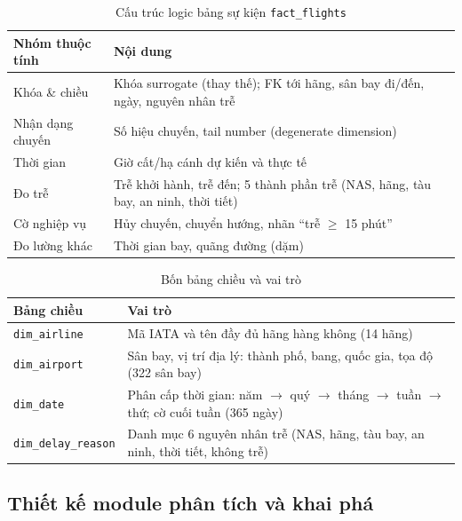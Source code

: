 \begin{table}[H]
\centering
\caption{Cấu trúc logic bảng sự kiện \texttt{fact\_flights}}
\vspace{4pt}
\begin{tabular}{|p{4cm}|p{10cm}|}
\hline
\textbf{Nhóm thuộc tính} & \textbf{Nội dung} \\ \hline
Khóa \& chiều & Khóa surrogate (thay thế); FK tới hãng, sân bay đi/đến, ngày, nguyên nhân trễ \\ \hline
Nhận dạng chuyến & Số hiệu chuyến, tail number (degenerate dimension) \\ \hline
Thời gian & Giờ cất/hạ cánh dự kiến và thực tế \\ \hline
Đo trễ & Trễ khởi hành, trễ đến; 5 thành phần trễ (NAS, hãng, tàu bay, an ninh, thời tiết) \\ \hline
Cờ nghiệp vụ & Hủy chuyến, chuyển hướng, nhãn ``trễ $\geq$ 15 phút'' \\ \hline
Đo lường khác & Thời gian bay, quãng đường (dặm) \\ \hline
\end{tabular}
\label{tab:fact_flights_logical}
\end{table}

\begin{table}[H]
\centering
\caption{Bốn bảng chiều và vai trò}
\vspace{4pt}
\begin{tabular}{|p{4cm}|p{10cm}|}
\hline
\textbf{Bảng chiều} & \textbf{Vai trò} \\ \hline
\texttt{dim\_airline} & Mã IATA và tên đầy đủ hãng hàng không (14 hãng) \\ \hline
\texttt{dim\_airport} & Sân bay, vị trí địa lý: thành phố, bang, quốc gia, tọa độ (322 sân bay) \\ \hline
\texttt{dim\_date} & Phân cấp thời gian: năm $\rightarrow$ quý $\rightarrow$ tháng $\rightarrow$ tuần $\rightarrow$ thứ; cờ cuối tuần (365 ngày) \\ \hline
\texttt{dim\_delay\_reason} & Danh mục 6 nguyên nhân trễ (NAS, hãng, tàu bay, an ninh, thời tiết, không trễ) \\ \hline
\end{tabular}
\label{tab:dimensions_logical}
\end{table}

\subsection{Thiết kế module phân tích và khai phá}

